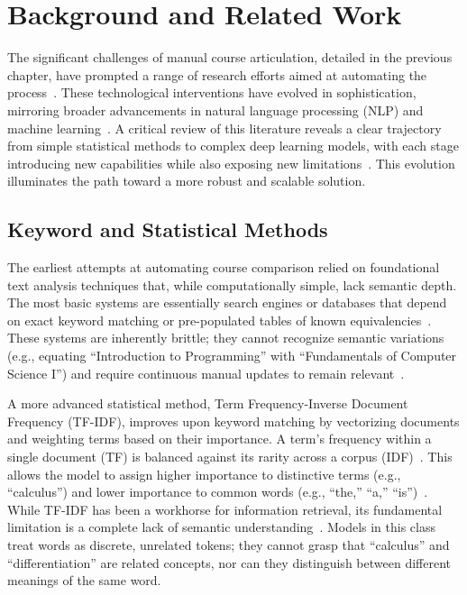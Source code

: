 \chapter{Background and Related Work}\label{ch:2}

The significant challenges of manual course articulation, detailed in the previous chapter, have prompted a range of research efforts aimed at automating the process~\cite{ma_course_recommendation_2017, PardosCourse2Vec2019, pardos-articulation-2019, JiangPardosMulti2VecEDM2020,XuPardosSubwordEmbeddings2024}.  These technological interventions have evolved in sophistication, mirroring broader advancements in natural language processing (NLP) and machine learning~\cite{shiferaw2024}.  A critical review of this literature reveals a clear trajectory from simple statistical methods to complex deep learning models, with each stage introducing new capabilities while also exposing new limitations~\cite{pardos-articulation-2019}.  This evolution illuminates the path toward a more robust and scalable solution.

\section{Keyword and Statistical Methods}\label{ch:2.1}
The earliest attempts at automating course comparison relied on foundational text analysis techniques that, while computationally simple, lack semantic depth.  The most basic systems are essentially search engines or databases that depend on exact keyword matching or pre-populated tables of known equivalencies~\cite{shamrock}.  These systems are inherently brittle; they cannot recognize semantic variations (e.g., equating ``Introduction to Programming'' with ``Fundamentals of Computer Science I'') and require continuous manual updates to remain relevant~\cite{shiferaw2024}.

A more advanced statistical method, Term Frequency-Inverse Document Frequency (TF-IDF), improves upon keyword matching by vectorizing documents and weighting terms based on their importance.  A term's frequency within a single document (TF) is balanced against its rarity across a corpus (IDF)~\cite{AIZAWA200345}.  This allows the model to assign higher importance to distinctive terms (e.g., ``calculus'') and lower importance to common words (e.g., ``the,'' ``a,'' ``is'')~\cite{AIZAWA200345}.  While TF-IDF has been a workhorse for information retrieval, its fundamental limitation is a complete lack of semantic understanding~\cite{AIZAWA200345}.  Models in this class treat words as discrete, unrelated tokens;  they cannot grasp that ``calculus'' and ``differentiation'' are related concepts, nor can they distinguish between different meanings of the same word.

